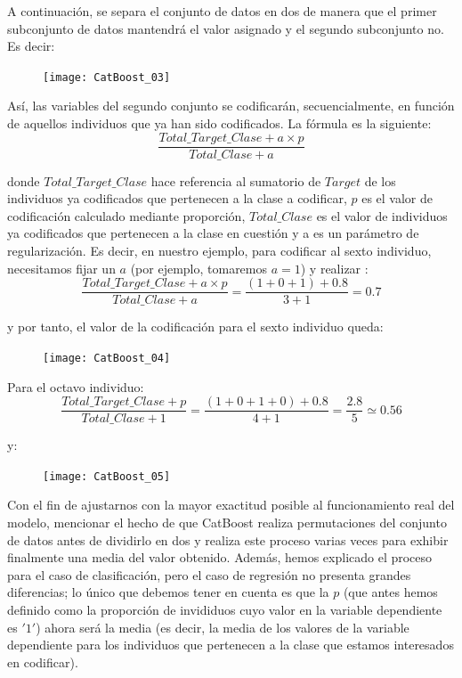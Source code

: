 \documentclass[12pt,twoside]{article}
\begin{document}
A continuación, se separa el conjunto de datos en dos de manera que el primer subconjunto de datos mantendrá el valor asignado y el segundo subconjunto no. Es decir:
\begin{figure}[h]
\centering
\texttt{[image: CatBoost\_03]}
\end{figure}

Así, las variables del segundo conjunto se codificarán, secuencialmente, en función de aquellos individuos que ya han sido codificados. La fórmula es la siguiente:
\begin{equation*}
\frac{Total\_Target\_Clase + a\times p}{Total\_Clase + a}
\end{equation*}

\noindent
donde $Total\_Target\_Clase$ hace referencia al sumatorio de $Target$ de los individuos ya codificados que pertenecen a la clase a codificar, $p$ es el valor de codificación calculado mediante proporción, $Total\_Clase$ es el valor de individuos ya codificados que pertenecen a la clase en cuestión y a es un parámetro de regularización. Es decir, en nuestro ejemplo, para codificar al sexto individuo, necesitamos fijar un $a$ (por ejemplo, tomaremos $a=1$) y realizar :
\begin{equation*}
\frac{Total\_Target\_Clase + a \times p}{Total\_Clase + a} = \frac{(1 + 0 + 1) + 0.8}{3 + 1} = 0.7
\end{equation*}

\noindent
y por tanto, el valor de la codificación para el sexto individuo queda:
\begin{figure}[h]
\centering
\texttt{[image: CatBoost\_04]}
\end{figure}

Para el octavo individuo:
\begin{equation*}
\frac{Total\_Target\_Clase + p}{Total\_Clase + 1} = \frac{(1 + 0 + 1 + 0) + 0.8}{4 + 1} = \frac{2.8}{5} \simeq 0.56
\end{equation*}

\noindent
y:
\begin{figure}[h]
\centering
\texttt{[image: CatBoost\_05]}
\end{figure}

Con el fin de ajustarnos con la mayor exactitud posible al funcionamiento real del modelo, mencionar el hecho de que CatBoost realiza permutaciones del conjunto de datos antes de dividirlo en dos y realiza este proceso varias veces para exhibir finalmente una media del valor obtenido. Además, hemos explicado el proceso para el caso de clasificación, pero el caso de regresión no presenta grandes diferencias; lo único que debemos tener en cuenta es que la $p$ (que antes hemos definido como la proporción de invididuos cuyo valor en la variable dependiente es $'1'$) ahora será la media (es decir, la media de los valores de la variable dependiente para los individuos que pertenecen a la clase que estamos interesados en codificar).
\end{document}
